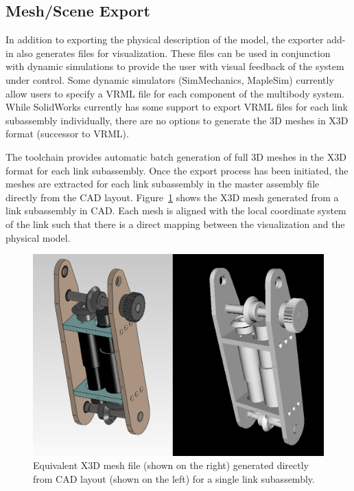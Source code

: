 
\subsection{Mesh/Scene Export} %
\label{sub:mesh_scene_export}
In addition to exporting the physical description of the model, the exporter add-in also generates files for visualization. These files can be used in conjunction with dynamic simulations to provide the user with visual feedback of the system under control. Some dynamic simulators (SimMechanics, MapleSim) currently allow users to specify a VRML file for each component of the multibody system. While SolidWorks currently has some support to export VRML files for each link subassembly individually, there are no options to generate the 3D meshes in X3D format (successor to VRML).

The toolchain provides automatic batch generation of full 3D meshes in the X3D format for each link subassembly. Once the export process has been initiated, the meshes are extracted for each link subassembly in the master assembly file directly from the CAD layout. Figure~\ref{fig:meshfile} shows the X3D mesh generated from a link subassembly in CAD. Each mesh is aligned with the local coordinate system of the link such that there is a direct mapping between the visualization and the physical model.

\begin{figure}[!h]
	\centering
    \includegraphics[scale=0.5]{fig/toolchain/cad2x3d.png}
  	\caption{Equivalent X3D mesh file (shown on the right) generated directly from CAD layout (shown on the left) for a single link subassembly.}
	\label{fig:meshfile}
\end{figure}

